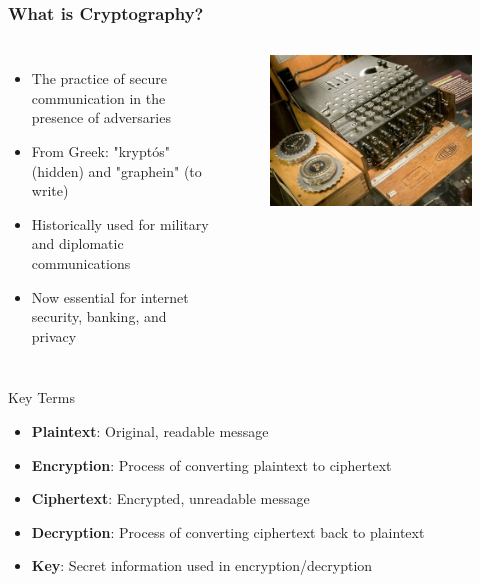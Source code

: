 \documentclass{beamer}
\begin{document}
\begin{frame}
    \frametitle{What is Cryptography?}
    \begin{columns}
    \begin{itemize}
        \item The practice of secure communication in the presence of adversaries
        \item From Greek: "kryptós" (hidden) and "graphein" (to write)
        \item Historically used for military and diplomatic communications
        \item Now essential for internet security, banking, and privacy
    \end{itemize}
    
    \begin{figure}
        \centering
        \includegraphics[width=0.8\linewidth]{cs12-cryptography-enigma-machine.jpg}
    \end{figure}
    \end{columns}
    
    \begin{block}{Key Terms}
        \begin{itemize}
            \item \textbf{Plaintext}: Original, readable message
            \item \textbf{Encryption}: Process of converting plaintext to ciphertext
            \item \textbf{Ciphertext}: Encrypted, unreadable message
            \item \textbf{Decryption}: Process of converting ciphertext back to plaintext
            \item \textbf{Key}: Secret information used in encryption/decryption
        \end{itemize}
    \end{block}
\end{frame}
\end{document}

